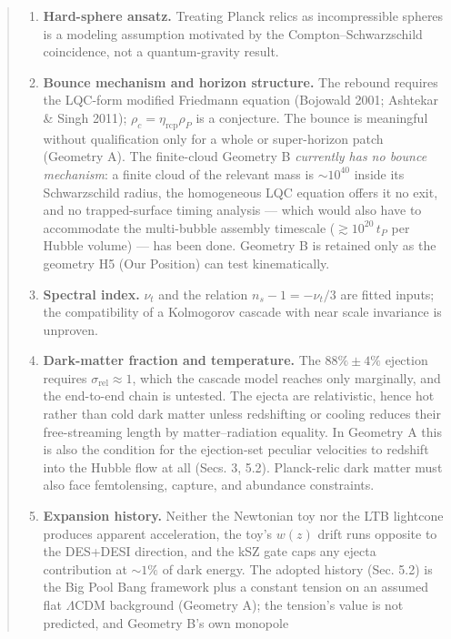 \documentclass[
]{article}
\providecommand{\tightlist}{%
  \setlength{\itemsep}{0pt}\setlength{\parskip}{0pt}}
\begin{document}
\begin{quote}
\begin{enumerate}
\def\labelenumi{\arabic{enumi}.}
\tightlist
\item
  \textbf{Hard-sphere ansatz.} Treating Planck relics as incompressible
  spheres is a modeling assumption motivated by the
  Compton--Schwarzschild coincidence, not a quantum-gravity result.
\item
  \textbf{Bounce mechanism and horizon structure.} The rebound requires
  the LQC-form modified Friedmann equation (Bojowald 2001; Ashtekar \&
  Singh 2011); \(\rho_c = \eta_{\text{rcp}}\rho_P\) is a conjecture. The
  bounce is meaningful without qualification only for a whole or
  super-horizon patch (Geometry A). The finite-cloud Geometry B
  \emph{currently has no bounce mechanism}: a finite cloud of the
  relevant mass is \(\sim\!10^{40}\) inside its Schwarzschild radius,
  the homogeneous LQC equation offers it no exit, and no trapped-surface
  timing analysis --- which would also have to accommodate the
  multi-bubble assembly timescale (\(\gtrsim 10^{20}\,t_P\) per Hubble
  volume) --- has been done. Geometry B is retained only as the geometry
  H5 (Our Position) can test kinematically.
\item
  \textbf{Spectral index.} \(\nu_t\) and the relation
  \(n_s - 1 = -\nu_t/3\) are fitted inputs; the compatibility of a
  Kolmogorov cascade with near scale invariance is unproven.
\item
  \textbf{Dark-matter fraction and temperature.} The \(88\% \pm 4\%\)
  ejection requires \(\sigma_{\text{rel}} \approx 1\), which the cascade
  model reaches only marginally, and the end-to-end chain is untested.
  The ejecta are relativistic, hence hot rather than cold dark matter
  unless redshifting or cooling reduces their free-streaming length by
  matter--radiation equality. In Geometry A this is also the condition
  for the ejection-set peculiar velocities to redshift into the Hubble
  flow at all (Secs. 3, 5.2). Planck-relic dark matter must also face
  femtolensing, capture, and abundance constraints.
\item
  \textbf{Expansion history.} Neither the Newtonian toy nor the LTB
  lightcone produces apparent acceleration, the toy's \(w(z)\) drift
  runs opposite to the DES+DESI direction, and the kSZ gate caps any
  ejecta contribution at \(\sim\!1\%\) of dark energy. The adopted
  history (Sec. 5.2) is the Big Pool Bang framework plus a constant
  tension on an assumed flat \(\Lambda\)CDM background (Geometry A); the
  tension's value is not predicted, and Geometry B's own monopole

\end{enumerate}
\end{quote}
\end{document}
